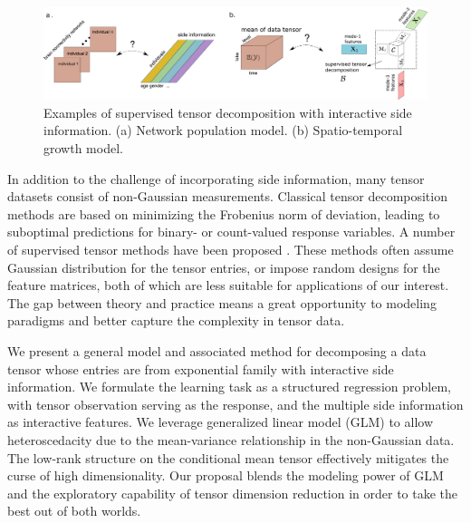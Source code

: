 \documentclass{article}
\theoremstyle{definition}
\theoremstyle{definition}
\begin{document}
 \begin{figure}[hbt]
\begin{center}
\includegraphics[width = 13.5cm]{demo.pdf}
\vspace{-.5cm}
\end{center}
\caption{Examples of supervised tensor decomposition with interactive side information. (a) Network population model. (b) Spatio-temporal growth model.} \label{fig:intro1}
\vspace{-.3cm}
\end{figure}

In addition to the challenge of incorporating side information, many tensor datasets consist of non-Gaussian measurements. Classical tensor decomposition methods are based on minimizing the Frobenius norm of deviation, leading to suboptimal predictions for binary- or count-valued response variables. A number of supervised tensor methods have been proposed \citep{narita2012tensor, zhao2012higher, yu2016learning,lock2018supervised}. These methods often assume Gaussian distribution for the tensor entries, or impose random designs for the feature matrices, both of which are less suitable for applications of our interest. The gap between theory and practice means a great opportunity to modeling paradigms and better capture the complexity in tensor data. 

We present a general model and associated method for decomposing a data tensor whose entries are from exponential family with interactive side information. We formulate the learning task as a structured regression problem, with tensor observation serving as the response, and the multiple side information as interactive features. We leverage generalized linear model (GLM)  to allow heteroscedacity due to the mean-variance relationship in the non-Gaussian data. The low-rank structure on the conditional mean tensor effectively mitigates the curse of high dimensionality.  Our proposal blends the modeling power of GLM and the exploratory capability of tensor dimension reduction in order to take the best out of both worlds. 
\end{document}
